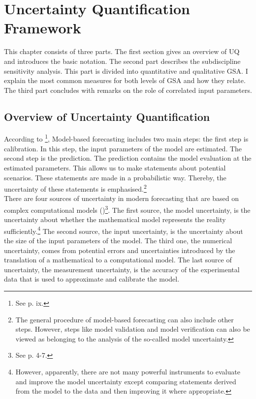 \section{Uncertainty Quantification Framework}
\thispagestyle{plain} %

This chapter consists of three parts. The first section gives an overview of UQ and introduces the basic notation. The second part describes the subdiscipline sensitivity analysis. This part is divided into quantitative and qualitative GSA. I explain the most common measures for both levels of GSA and how they relate. The third part concludes with remarks on the role of correlated input parameters.

\subsection{Overview of Uncertainty Quantification}
According to \cite{Smith.2014}\footnote{See p. ix.}, Model-based forecasting includes two main steps: the first step is calibration. In this step, the input parameters of the model are estimated. The second step is the prediction. The prediction contains the model evaluation at the estimated parameters. This allows us to make statements about potential scenarios. These statements are made in a probabilistic way. Thereby, the uncertainty of these statements is emphasised.\footnote{The general procedure of model-based forecasting can also include other steps. However, steps like model validation and model verification can also be viewed as belonging to the analysis of the so-called model uncertainty.}\\
\newline
There are four sources of uncertainty in modern forecasting that are based on complex computational models (\cite{Smith.2014})\footnote{See p. 4-7.}. The first source, the model uncertainty, is the uncertainty about whether the mathematical model represents the reality sufficiently.\footnote{However, apparently, there are not many powerful instruments to evaluate and improve the model uncertainty except comparing statements derived from the model to the data and then improving it where appropriate.} The second source, the input uncertainty, is the uncertainty about the size of the input parameters of the model. The third one, the numerical uncertainty, comes from potential errors and uncertainties introduced by the translation of a mathematical to a computational model. The last source of uncertainty, the measurement uncertainty, is the accuracy of the experimental data that is used to approximate and calibrate the model.

